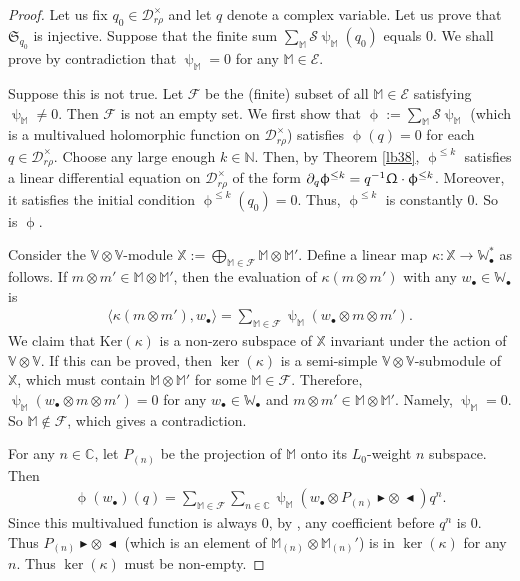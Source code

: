 \documentclass[12pt,a4paper,notitlepage]{article}
\theoremstyle{definition}
\theoremstyle{plain}
\newcommand{\fk}{\mathfrak}
\newcommand{\mc}{\mathcal}
\newcommand{\bk}[1]{\langle {#1}\rangle}
\newcommand{\mbb}{\mathbb}
\newcommand{\blt}{\bullet}
\newcommand{\Vbb}{\mathbb V}
\newcommand{\Wbb}{\mathbb W}
\newcommand{\Mbb}{\mathbb M}
\newcommand{\Cbb}{\mathbb C}
\newcommand{\Nbb}{\mathbb N}
\newcommand{\btl}{\blacktriangleleft}
\newcommand{\btr}{\blacktriangleright}
\newcommand{\Ker}{\mathrm{Ker}}
\numberwithin{equation}{section}
\begin{document}
\begin{proof}
	Let us fix $q_0\in\mc D_{r\rho}^\times$ and let $q$ denote a complex variable. Let us prove that $\fk S_{q_0}$ is injective. Suppose that the finite sum $\sum_\Mbb\mc S\uppsi_\Mbb(q_0)$ equals $0$. We shall prove by contradiction that $\uppsi_\Mbb=0$ for any $\Mbb\in\mc E$. 
	
	Suppose this is not true. Let $\mc F$ be the (finite) subset of all $\Mbb\in\mc E$ satisfying $\uppsi_\Mbb\neq0$. Then $\mc F$ is not an empty set. 	We first show that $\upphi:=\sum_\Mbb\mc S\uppsi_\Mbb$ (which is a multivalued holomorphic function on $\mc D_{r\rho}^\times$) satisfies $\upphi(q)=0$ for each $q\in\mc D_{r\rho}^\times$. Choose any large enough  $k\in\Nbb$. Then, by Theorem \ref{lb38},  $\upphi^{\leq k}$ satisfies a linear differential equation on $\mc D_{r\rho}^\times$ of the form $\partial_q\upphi^{\leq k}=q^{-1}\Upomega\cdot \upphi^{\leq k}$. Moreover, it satisfies the initial condition $\upphi^{\leq k}(q_0)=0$. Thus, $\upphi^{\leq k}$ is constantly $0$. So is $\upphi$.
	
	Consider the $\Vbb\otimes\Vbb$-module $\mbb X:=\bigoplus_{\Mbb\in\mc F}\Mbb\otimes\Mbb'$. Define a linear map $\kappa:\mbb X\rightarrow \Wbb_\blt^*$ as follows. If $m\otimes m'\in\Mbb\otimes\Mbb'$, then the evaluation of $\kappa(m\otimes m')$ with any $w_\blt\in\Wbb_\blt$ is
	\begin{align*}
	\bk{\kappa(m\otimes m'),w_\blt}=\sum_{\Mbb\in\mc F}\uppsi_\Mbb(w_\blt\otimes m\otimes m').
	\end{align*}
	We claim that $\Ker(\kappa)$ is a non-zero subspace of $\mbb X$ invariant under the action of $\Vbb\otimes \Vbb$. If this can be proved, then $\ker(\kappa)$ is a semi-simple $\Vbb\otimes\Vbb$-submodule of $\mbb X$, which must contain $\Mbb\otimes\Mbb'$ for some $\Mbb\in\mc F$. Therefore, $\uppsi_\Mbb(w_\blt\otimes m\otimes m')=0$ for any $w_\blt\in\Wbb_\blt$ and $m\otimes m'\in\Mbb\otimes\Mbb'$. Namely, $\uppsi_\Mbb=0$. So $\Mbb\notin\mc F$, which gives a contradiction. 
	
	For any $n\in\Cbb$, let $P_{(n)}$ be the projection of $\Mbb$ onto its $L_0$-weight $n$ subspace. Then 
	\begin{align*}
	\upphi(w_\blt)(q)=\sum_{\Mbb\in\mc F}\sum_{n\in\Cbb} \uppsi_\Mbb(w_\blt\otimes P_{(n)}\btr\otimes~\btl)q^n.
	\end{align*}
	Since this multivalued function is always $0$, by \cite[Prop. 2.1]{Hua17}, any coefficient before $q^n$ is $0$. Thus $P_{(n)}\btr\otimes~\btl$ (which is an element of $\Mbb_{(n)}\otimes\Mbb_{(n)}'$) is in $\ker(\kappa)$ for any $n$. Thus $\ker(\kappa)$ must be non-empty.
	

\end{proof}
\end{document}
